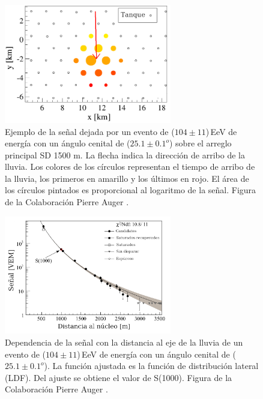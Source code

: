 \begin{figure}[H]
	\begin{small}
		\begin{center}
			\includegraphics[width=0.65\textwidth]{evento_sd.png}
		\end{center}
		\caption{Ejemplo de la señal dejada por un evento de ($104\pm11$)\,EeV de energía con un ángulo cenital de ($25.1\pm0.1 ^o$) sobre el arreglo principal SD 1500 m. La flecha indica la dirección de arribo de la lluvia. Los colores de los círculos representan el tiempo de arribo de la lluvia, los primeros en amarillo y los últimos en rojo. El área de los círculos pintados es proporcional al logaritmo de la señal. Figura de la Colaboración Pierre Auger \cite{como_funciona_auger}. } 	\label{fig:evento_sd}
	\end{small}
\end{figure}
\begin{figure}[H]
	\begin{small}
		\begin{center}
			\includegraphics[width=0.65\textwidth]{evento_s1000.png}
		\end{center}
		\caption{Dependencia de la señal con la distancia al  eje de la lluvia de un evento de ($104\pm11$)\,EeV de energía con un ángulo cenital de ($25.1\pm0.1 ^o$). La función ajustada es la función de distribución lateral (LDF). Del ajuste se obtiene el valor de S(1000). Figura de la Colaboración Pierre Auger \cite{como_funciona_auger}. } 	\label{fig:evento_S1000}
	\end{small}
\end{figure}

